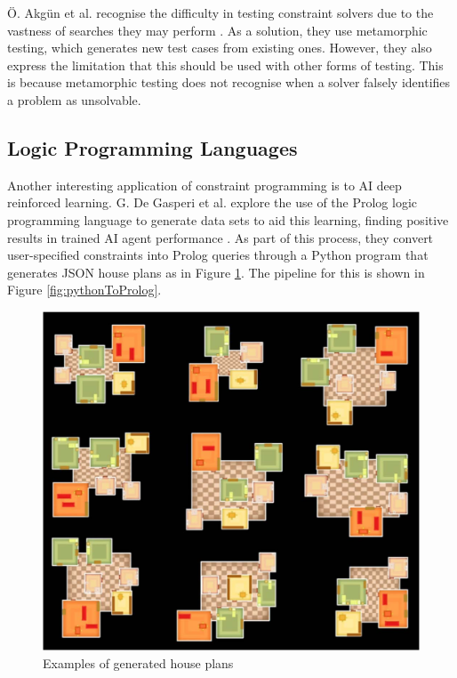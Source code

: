 Ö. Akgün et al. recognise the difficulty in testing constraint solvers due to the vastness of searches they may perform \cite{Metamorphic_Testing}. As a solution, they use metamorphic testing, which generates new test cases from existing ones. However, they also express the limitation that this should be used with other forms of testing. This is because metamorphic testing does not recognise when a solver falsely identifies a problem as unsolvable.

\subsection{Logic Programming Languages}
Another interesting application of constraint programming is to AI deep reinforced learning. G. De Gasperi et al. explore the use of the Prolog logic programming language to generate data sets to aid this learning, finding positive results in trained AI agent performance \cite{Prolog_Deep_Learning}. As part of this process, they convert user-specified constraints into Prolog queries through a Python program that generates JSON house plans as in Figure \ref{fig:housePlans}. The pipeline for this is shown in Figure \ref{fig:pythonToProlog}.

\begin{figure}[H]
    \centering
    \includegraphics[width=\textwidth, height=0.3\textheight, keepaspectratio]{Images/HousePlans.jpg}
    \caption{Examples of generated house plans \cite{Prolog_Deep_Learning}}
    \label{fig:housePlans}
\end{figure}

